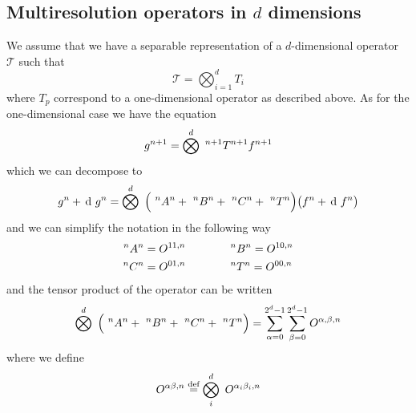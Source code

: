 
\subsection{Multiresolution operators in $d$ dimensions}
We assume that we have a separable representation of a $d$-dimensional
operator $\mathcal{T}$ such that
\begin{equation}
    \mathcal{T} = \bigotimes_{i=1}^d T_i
\end{equation}
where $T_p$ correspond to a one-dimensional operator as described above.
As for the one-dimensional case we have the equation
\begin{equation}
    {g}^{n+1} = \bigotimes^d\ ^{n+1}T^{n+1} {f}^{n+1}
\end{equation}
which we can decompose to
\begin{equation}
    \scalingrep{g}{n} + \waveletrep{g}{n} = 
	\bigotimes^d\ \Big(\ \A{n}{n} +\ \B{n}{n} +\ \C{n}{n}+\ \T{n}{n}\Big) 
	\big(\scalingrep{f}{n} + \waveletrep{f}{n}\big)
\end{equation}
and we can simplify the notation in the following way
\begin{align}
    \begin{split}
        ^{n}A^{n} &= O^{11,n} \qquad \qquad
	^{n}B^{n} = O^{10,n} \\
	^{n}C^{n} &= O^{01,n} \qquad \qquad
	^{n}T^{n} = O^{00,n}
    \end{split}
\end{align}
and the tensor product of the operator can be written
\begin{equation}
    \bigotimes^d\ \Big(\ \A{n}{n}+\ \B{n}{n} +\ \C{n}{n}+\ \T{n}{n}\Big) =
	\sum_{\alpha=0}^{2^d-1} \sum_{\beta=0}^{2^d-1} O^{\alpha,\beta,n}
\end{equation}
where we define
\begin{equation}
    O^{\alpha\beta,n} \mydef \bigotimes_{i}^d\ O^{\alpha_i\beta_i,n}
\end{equation}

